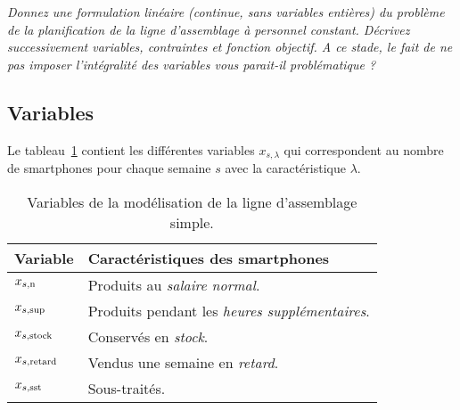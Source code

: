 \question %
\emph{Donnez une formulation linéaire (continue, sans variables entières) 
du problème de la planification de la ligne d'assemblage à personnel constant.
Décrivez successivement variables, contraintes et fonction objectif. 
A ce stade, le fait de ne pas imposer l'intégralité des variables 
vous parait-il problématique ?}

\subsection*{Variables}
Le tableau~\ref{tab:variablesQuestion1} contient les différentes variables $x_{s,\lambda}$
qui correspondent au nombre de smartphones pour chaque semaine $s$
avec la caractéristique $\lambda$.

\begin{table}[h]
  \begin{center}
  \begin{tabular}{|l|l|}
    \hline
    Variable & Caractéristiques des smartphones \\
    \hline
    \hline
    $x_{s,\text{n}}$ & Produits au \emph{salaire normal}. \\
    \hline
    $x_{s,\text{sup}}$ & Produits pendant les \emph{heures supplémentaires}. \\
    \hline
    $x_{s,\text{stock}}$ & Conservés en \emph{stock}. \\
    \hline
    $x_{s,\text{retard}}$ & Vendus une semaine en \emph{retard}. \\
    \hline
    $x_{s,\text{sst}}$ & Sous-traités. \\
    \hline
  \end{tabular}
  \caption{Variables de la modélisation de la ligne d'assemblage simple.}
  \label{tab:variablesQuestion1}
  \end{center}
\end{table}


